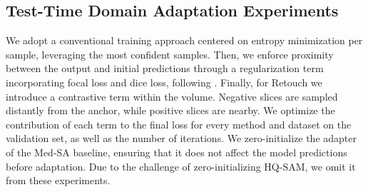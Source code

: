 \subsection{Test-Time Domain Adaptation Experiments}
We adopt a conventional training approach centered on entropy minimization per sample, leveraging the most confident samples. Then, we enforce proximity between the output and initial predictions through a regularization term incorporating focal loss and dice loss, following . Finally, for Retouch we introduce a contrastive term within the volume. Negative slices are sampled distantly from the anchor, while positive slices are nearby. We optimize the contribution of each term to the final loss for every method and dataset on the validation set, as well as the number of iterations. We zero-initialize the adapter of the Med-SA baseline, ensuring that it does not affect the model predictions before adaptation. Due to the challenge of zero-initializing HQ-SAM, we omit it from these experiments.
